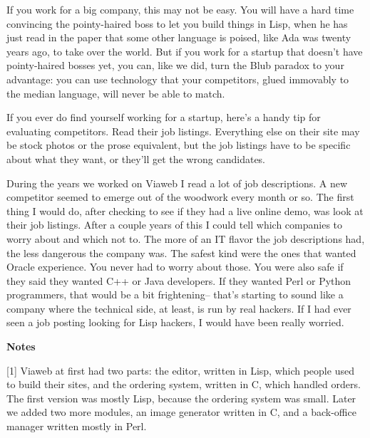 If you work for a big company, this
                  may not be easy. You will have a hard time convincing the
                  pointy-haired boss to let you build things in Lisp, when he
                  has just read in the paper that some other language is poised,
                  like Ada was twenty years ago, to take over the world. But if
                  you work for a startup that doesn't have pointy-haired bosses
                  yet, you can, like we did, turn the Blub paradox to your
                  advantage: you can use technology that your competitors, glued
                  immovably to the median language, will never be able to
                  match.

If you ever do find yourself working for a
                  startup, here's a handy tip for evaluating competitors. Read
                  their job listings. Everything else on their site may be stock
                  photos or the prose equivalent, but the job listings have to
                  be specific about what they want, or they'll get the wrong
                  candidates.

During the years we worked on Viaweb I
                  read a lot of job descriptions. A new competitor seemed to
                  emerge out of the woodwork every month or so. The first thing
                  I would do, after checking to see if they had a live online
                  demo, was look at their job listings. After a couple years of
                  this I could tell which companies to worry about and which not
                  to. The more of an IT flavor the job descriptions had, the
                  less dangerous the company was. The safest kind were the ones
                  that wanted Oracle experience. You never had to worry about
                  those. You were also safe if they said they wanted C++ or Java
                  developers. If they wanted Perl or Python programmers, that
                  would be a bit frightening-- that's starting to sound like a
                  company where the technical side, at least, is run by real
                  hackers. If I had ever seen a job posting looking for Lisp
                  hackers, I would have been really worried.




                  \textbf{Notes}

[1] Viaweb at first had two parts: the
                  editor, written in Lisp, which people used to build their
                  sites, and the ordering system, written in C, which handled
                  orders. The first version was mostly Lisp, because the
                  ordering system was small. Later we added two more modules, an
                  image generator written in C, and a back-office manager
                  written mostly in Perl.

